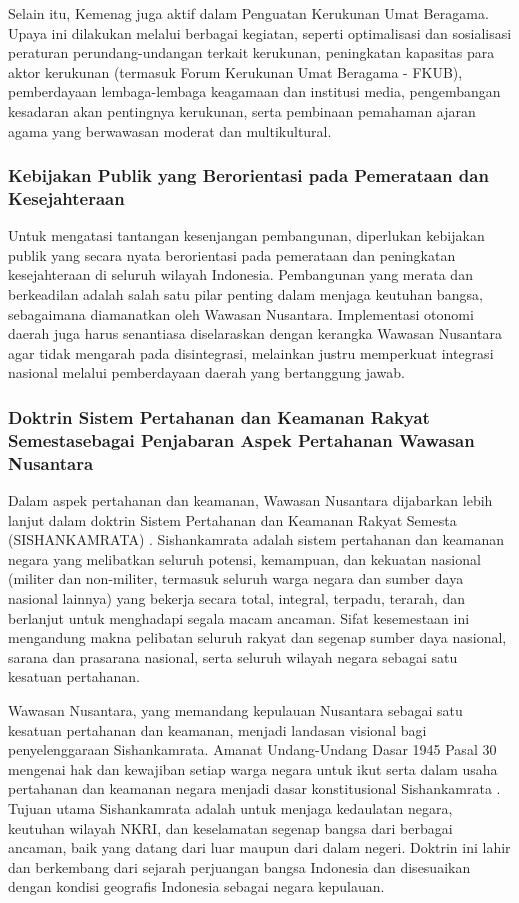 \documentclass[12pt, a4paper]{article}
\begin{document}
Selain itu, Kemenag juga aktif dalam Penguatan Kerukunan Umat Beragama. Upaya ini dilakukan melalui berbagai kegiatan, seperti optimalisasi dan sosialisasi peraturan perundang-undangan terkait kerukunan, peningkatan kapasitas para aktor kerukunan (termasuk Forum Kerukunan Umat Beragama - FKUB), pemberdayaan lembaga-lembaga keagamaan dan institusi media, pengembangan kesadaran akan pentingnya kerukunan, serta pembinaan pemahaman ajaran agama yang berwawasan moderat dan multikultural.  

\subsubsection*{Kebijakan Publik yang Berorientasi pada Pemerataan dan Kesejahteraan}

Untuk mengatasi tantangan kesenjangan pembangunan, diperlukan kebijakan publik yang secara nyata berorientasi pada pemerataan dan peningkatan kesejahteraan di seluruh wilayah Indonesia. Pembangunan yang merata dan berkeadilan adalah salah satu pilar penting dalam menjaga keutuhan bangsa, sebagaimana diamanatkan oleh Wawasan Nusantara. Implementasi otonomi daerah juga harus senantiasa diselaraskan dengan kerangka Wawasan Nusantara agar tidak mengarah pada disintegrasi, melainkan justru memperkuat integrasi nasional melalui pemberdayaan daerah yang bertanggung jawab.  

\subsubsection*{Doktrin Sistem Pertahanan dan Keamanan Rakyat Semestasebagai Penjabaran Aspek Pertahanan Wawasan Nusantara}

Dalam aspek pertahanan dan keamanan, Wawasan Nusantara dijabarkan lebih lanjut dalam doktrin Sistem Pertahanan dan Keamanan Rakyat Semesta (SISHANKAMRATA) \cite{SISHANKAMRATA}. Sishankamrata adalah sistem pertahanan dan keamanan negara yang melibatkan seluruh potensi, kemampuan, dan kekuatan nasional (militer dan non-militer, termasuk seluruh warga negara dan sumber daya nasional lainnya) yang bekerja secara total, integral, terpadu, terarah, dan berlanjut untuk menghadapi segala macam ancaman. Sifat kesemestaan ini mengandung makna pelibatan seluruh rakyat dan segenap sumber daya nasional, sarana dan prasarana nasional, serta seluruh wilayah negara sebagai satu kesatuan pertahanan.  

Wawasan Nusantara, yang memandang kepulauan Nusantara sebagai satu kesatuan pertahanan dan keamanan, menjadi landasan visional bagi penyelenggaraan Sishankamrata. Amanat Undang-Undang Dasar 1945 Pasal 30 mengenai hak dan kewajiban setiap warga negara untuk ikut serta dalam usaha pertahanan dan keamanan negara menjadi dasar konstitusional Sishankamrata \cite{sissu}. Tujuan utama Sishankamrata adalah untuk menjaga kedaulatan negara, keutuhan wilayah NKRI, dan keselamatan segenap bangsa dari berbagai ancaman, baik yang datang dari luar maupun dari dalam negeri. Doktrin ini lahir dan berkembang dari sejarah perjuangan bangsa Indonesia dan disesuaikan dengan kondisi geografis Indonesia sebagai negara kepulauan.  
\end{document}
